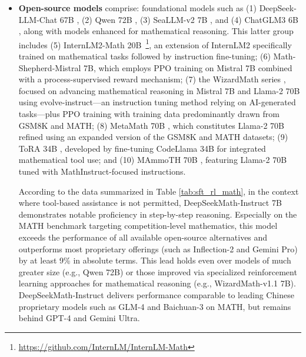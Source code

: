 \begin{itemize}[topsep=0pt]
\begin{itemize}[topsep=0pt]
    \item \textbf{Closed-source models} in our comparison include: (1) members of the GPT family, with GPT-4 \citep{gpt4} and GPT-4 Code Interpreter~\footnote{\url{https://openai.com/blog/chatgpt-plugins\#\#code-interpreter}} as the leading representatives, (2) Gemini Ultra and Pro \citep{gemini}, (3) Inflection-2 \citep{inflection-2}, (4) Grok-1~\footnote{\url{https://x.ai/model-card}}, as well as models recently introduced by Chinese companies such as (5) Baichuan-3~\footnote{\url{https://www.baichuan-ai.com}}, and (6) the most recent GLM-4~\footnote{\url{https://open.bigmodel.cn/dev/api\#glm-4}} from the GLM suite \citep{glm}.
\end{itemize}

These models are designed for broad applications, the majority of which have been subjected to various alignment techniques.

\item \textbf{Open-source models} comprise: foundational models such as (1) DeepSeek-LLM-Chat 67B \citep{deepseek-llm}, (2) Qwen 72B \citep{qwen}, (3) SeaLLM-v2 7B \citep{seallm}, and (4) ChatGLM3 6B \citep{chatglm3}, along with models enhanced for mathematical reasoning. This latter group includes (5) InternLM2-Math 20B~\footnote{\url{https://github.com/InternLM/InternLM-Math}}, an extension of InternLM2 specifically trained on mathematical tasks followed by instruction fine-tuning; (6) Math-Shepherd-Mistral 7B, which employs PPO training \citep{schulman2017proximal} on Mistral 7B \citep{mistral} combined with a process-supervised reward mechanism; (7) the WizardMath series \citep{wizardmath}, focused on advancing mathematical reasoning in Mistral 7B and Llama-2 70B \citep{llama2} using evolve-instruct—an instruction tuning method relying on AI-generated tasks—plus PPO training with training data predominantly drawn from GSM8K and MATH; (8) MetaMath 70B \citep{metamath}, which constitutes Llama-2 70B refined using an expanded version of the GSM8K and MATH datasets; (9) ToRA 34B \cite{tora}, developed by fine-tuning CodeLlama 34B for integrated mathematical tool use; and (10) MAmmoTH 70B \citep{MathInstruct}, featuring Llama-2 70B tuned with MathInstruct-focused instructions.

According to the data summarized in Table \ref{tab:sft_rl_math}, in the context where tool-based assistance is not permitted, DeepSeekMath-Instruct 7B demonstrates notable proficiency in step-by-step reasoning. Especially on the MATH benchmark targeting competition-level mathematics, this model exceeds the performance of all available open-source alternatives and outperforms most proprietary offerings (such as Inflection-2 and Gemini Pro) by at least 9\% in absolute terms. This lead holds even over models of much greater size (e.g., Qwen 72B) or those improved via specialized reinforcement learning approaches for mathematical reasoning (e.g., WizardMath-v1.1 7B). DeepSeekMath-Instruct delivers performance comparable to leading Chinese proprietary models such as GLM-4 and Baichuan-3 on MATH, but remains behind GPT-4 and Gemini Ultra.


\end{itemize}

